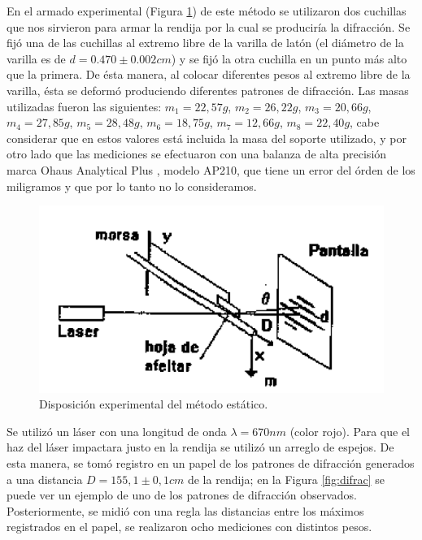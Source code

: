 \documentclass[twoside,twocolumn,a4paper]{article}
\begin{document}
En el armado experimental (Figura \ref{fig:disenoestatico}) de este m\'etodo se utilizaron dos cuchillas que nos sirvieron para armar la rendija por la cual se producir\'ia la difracci\'on. Se fij\'o una de las cuchillas al extremo libre de la varilla de lat\'on (el di\'ametro de la varilla es de $d = 0.470 \pm 0.002cm$) y se fij\'o la otra cuchilla en un punto m\'as alto que la primera. De \'esta manera, al colocar diferentes pesos al extremo libre de la varilla, \'esta se deform\'o produciendo diferentes patrones de difracci\'on. Las masas utilizadas fueron las siguientes: $m_{1} = 22,57 g$, $m_{2} = 26,22 g$, $m_{3} = 20,66 g$, $m_{4} = 27,85 g$, $m_{5} = 28,48 g$, $m_{6} = 18,75 g$, $m_{7} = 12,66 g$, $m_{8} = 22,40 g$, cabe considerar que en estos valores est\'a incluida la masa del soporte utilizado, y por otro lado que las mediciones se efectuaron con una balanza de alta precisi\'on marca Ohaus Analytical Plus , modelo AP210, que tiene un error del \'orden de los miligramos y que por lo tanto no lo consideramos. \newline

\begin{figure}[H]
\includegraphics[width=\linewidth]{disenoestatico.png}
\caption{Disposici\'on experimental del m\'etodo est\'atico.}
\label{fig:disenoestatico}
\end{figure}

Se utiliz\'o un l\'aser con una longitud de onda $\lambda= 670 nm$ (color rojo). Para que el haz del l\'aser impactara justo en la rendija se utiliz\'o un arreglo de espejos. De esta manera, se tom\'o registro en un papel de los patrones de difracci\'on generados a una distancia $D = 155,1 \pm 0,1 cm$ de la rendija; en la Figura \ref{fig:difrac} se puede ver un ejemplo de uno de los patrones de difracci\'on observados. Posteriormente, se midi\'o con una regla las distancias entre los m\'aximos registrados en el papel, se realizaron ocho mediciones con distintos pesos.
\end{document}
